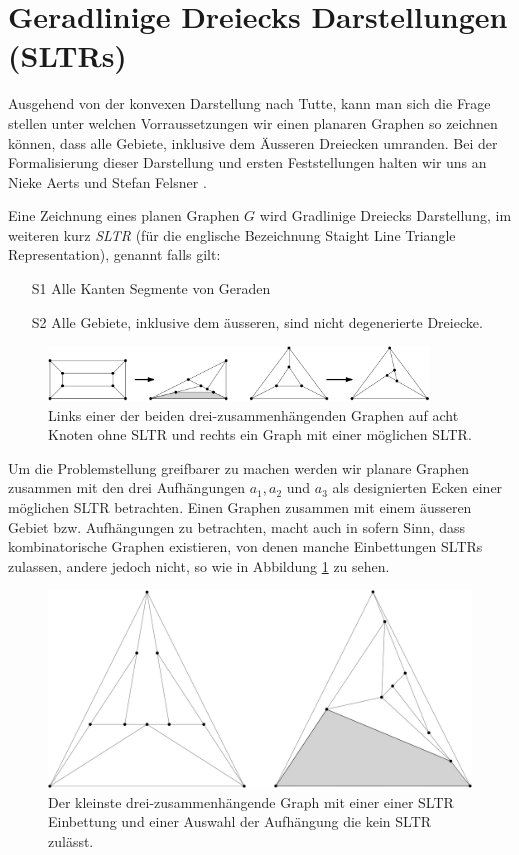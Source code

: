 \section{Geradlinige Dreiecks Darstellungen (SLTRs)}

Ausgehend von der konvexen Darstellung nach Tutte, kann man sich die Frage stellen unter welchen Vorraussetzungen wir einen planaren Graphen so zeichnen können, dass alle Gebiete, inklusive dem Äusseren Dreiecken umranden. Bei der Formalisierung dieser Darstellung und ersten Feststellungen halten wir uns an Nieke Aerts und Stefan Felsner \cite{af13}.

\begin{definition}[SLTR]\label{defsltr}
Eine Zeichnung eines planen Graphen $G$ wird Gradlinige Dreiecks Darstellung, im weiteren kurz \textit{SLTR} (für die englische Bezeichnung Staight Line Triangle Representation), genannt falls gilt:
\begin{itemize}
\item[S1] Alle Kanten Segmente von Geraden
\item[S2] Alle Gebiete, inklusive dem äusseren, sind nicht degenerierte Dreiecke.
\end{itemize}
\end{definition}

\begin{figure}[h]
	\centering
  \includegraphics[width=0.9\textwidth]{sltr-example.png}
	\caption{Links einer der beiden drei-zusammenhängenden Graphen auf acht Knoten ohne SLTR und rechts ein Graph mit einer möglichen SLTR.}
\end{figure}

Um die Problemstellung greifbarer zu machen werden wir planare Graphen zusammen mit den drei Aufhängungen $a_1,a_2$ und $a_3$ als designierten Ecken einer möglichen SLTR betrachten. Einen Graphen zusammen mit einem äusseren Gebiet bzw. Aufhängungen zu betrachten, macht auch in sofern Sinn, dass kombinatorische Graphen existieren, von denen manche Einbettungen SLTRs zulassen, andere jedoch nicht, so wie in Abbildung \ref{10_example} zu sehen.

\begin{figure}
	\centering
  \includegraphics[scale=0.1]{10_example.png}
	\caption{Der kleinste drei-zusammenhängende Graph mit einer einer SLTR Einbettung und einer Auswahl der Aufhängung die kein SLTR zulässt.}
	\label{10_example}
\end{figure}

